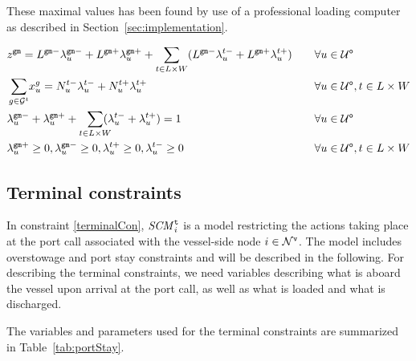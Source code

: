 These maximal values has been found by use of a professional loading computer as described in Section~\ref{sec:implementation}. 

\begin{alignat}{3}    
\label{convexGM1}
& z^\ttt{gm} = L^{\ttt{gm}-}\lambda^{\ttt{gm}-}_{u}+L^{\ttt{gm}+}\lambda^{\ttt{gm}+}_{u}
+ \sum_{t\in L\times W}(L^{\ttt{gm}-}\lambda^{t-}_{u} + L^{\ttt{gm}+}\lambda^{t+}_{u})\quad 
																																								&& \forall u\in \mc{U}^\ttt{o} \\
\label{convexGM2}
&\smashoperator[r]{\sum_{g \in \mc{G}^{t}}} x^{g}_{u} = N^{t-}_{u} \lambda^{t-}_{u} + N^{t+}_{u} \lambda^{t+}_{u}\quad
																																								&& \forall u\in \mc{U}^\ttt{o}, t\in L\times W\\
\label{lambdaSum} 
& \lambda^{\ttt{gm}-}_{u}+\lambda^{\ttt{gm}+}_{u} + \so[r]{\sum_{t \in L\times W}}(\lambda^{t-}_{u} + \lambda^{t+}_{u}) = 1 
																																								&& \forall u\in \mc{U}^\ttt{o}\\
\label{positiveLambdas}
&\lambda^{\ttt{gm}+}_{u}\geq 0,	\lambda^{\ttt{gm}-}_{u}\geq 0, \lambda^{t+}_{u}\geq 0, \lambda^{t-}_{u}\geq 0
																																								&& \forall u\in \mc{U}^\ttt{o}, t\in L\times W
\end{alignat} 

\subsection{Terminal constraints}
In constraint \eqref{terminalCon}, $\mathit{SCM}^\texttt{t}_{i}$ is a model restricting the actions taking place at the port call associated with the vessel-side node $i\in \mathcal{N}^\texttt{v}$.
The model includes overstowage and port stay constraints and will be described in the following. For describing the terminal constraints, we need variables describing what is aboard the vessel upon arrival at the port call, as well as what is loaded and what is discharged.

The variables and parameters used for the terminal constraints are summarized in Table~\ref{tab:portStay}. 

